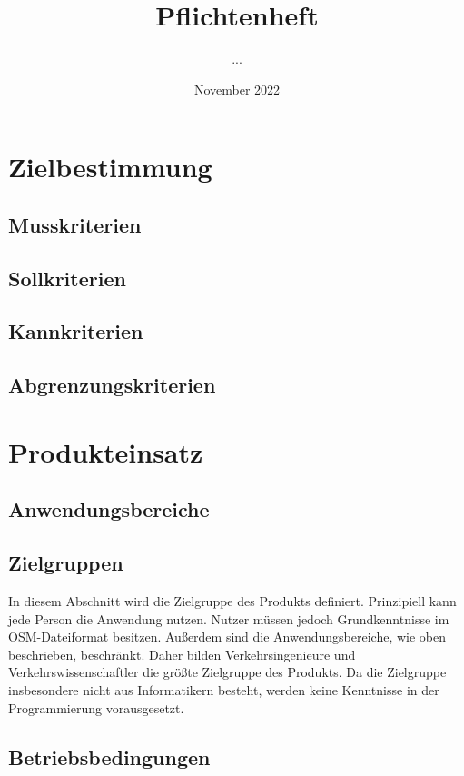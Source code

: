 \documentclass[parskip=full]{scrartcl}
\title{Pflichtenheft}
\author{...}
\date{November 2022}
\begin{document}
\maketitle
\newpage

\tableofcontents
\newpage




\section{Zielbestimmung}

\subsection{Musskriterien}
\subsection{Sollkriterien}
\subsection{Kannkriterien}
\subsection{Abgrenzungskriterien}
\newpage



\section{Produkteinsatz}

\subsection{Anwendungsbereiche}
\subsection{Zielgruppen}
In diesem Abschnitt wird die Zielgruppe des Produkts definiert. Prinzipiell kann jede Person die Anwendung nutzen. Nutzer müssen jedoch Grundkenntnisse im OSM-Dateiformat besitzen. Außerdem sind die Anwendungsbereiche, wie oben beschrieben, beschränkt. Daher bilden Verkehrsingenieure und Verkehrswissenschaftler die größte Zielgruppe des Produkts. Da die Zielgruppe insbesondere nicht aus Informatikern besteht, werden keine Kenntnisse in der Programmierung vorausgesetzt.

\subsection{Betriebsbedingungen}
\newpage
\end{document}
